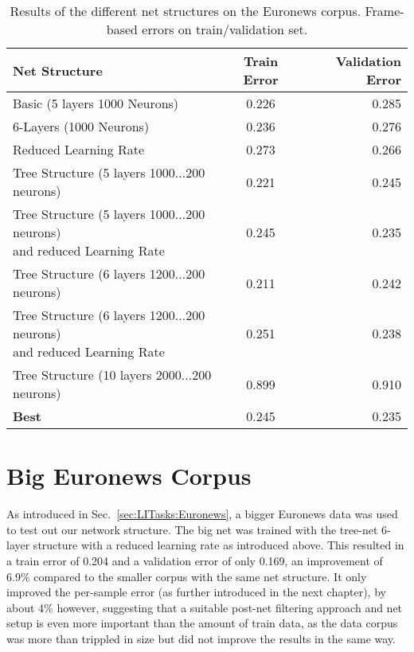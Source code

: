 \begin{table}[h!]

\centering
\begin{tabular}{| l | c | r | }
	\hline
	\textbf{Net Structure} & \textbf{Train Error} & \textbf{Validation Error}  \\
	\hline
	Basic (5 layers 1000 Neurons) & 0.226 &  0.285 \\
	\hline
	6-Layers (1000 Neurons) & 0.236 & 0.276 \\
	\hline
	Reduced Learning Rate & 0.273 & 0.266 \\ 
	\hline
	Tree Structure (5 layers 1000...200 neurons) & 0.221 & 0.245 \\
	\hline
	\parbox[t]{5cm}{Tree Structure (5 layers 1000...200 neurons)\\and reduced Learning Rate} & 0.245 & 0.235 \\
	\hline
	Tree Structure (6 layers 1200...200 neurons) & 0.211 & 0.242 \\
	\hline
	\parbox[t]{5cm}{Tree Structure (6 layers 1200...200 neurons) \\
	and reduced Learning Rate} & 0.251 & 0.238 \\
	\hline
	Tree Structure (10 layers 2000...200 neurons) & 0.899 & 0.910 \\
	\hline
	\textbf{Best} & 0.245 & 0.235 \\
	\hline
\end{tabular}
\caption{Results of the different net structures on the Euronews corpus. Frame-based errors on train/validation set.}
\label{tab:resFrameBased}
\end{table}

\section{Big Euronews Corpus}
\label{sec:IDNetworkBig}

As introduced in Sec.~\ref{sec:LITasks:Euronews}, a bigger Euronews data was used to test out our network structure. The big net was trained with the tree-net 6-layer structure with a reduced learning rate as introduced above. This resulted in a train error of 0.204 and a validation error of only 0.169, an improvement of 6.9\% compared to the smaller corpus with the same net structure. It only improved the per-sample error (as further introduced in the next chapter), by about 4\% however, suggesting that a suitable post-net filtering approach and net setup is even more important than the amount of train data, as the data corpus was more than trippled in size but did not improve the results in the same way.

